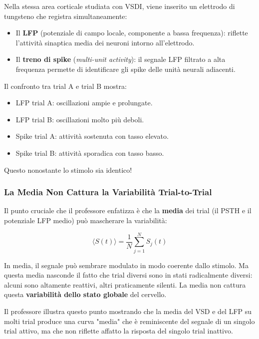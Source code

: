 Nella stessa area corticale studiata con VSDI, viene inserito un elettrodo di tungsteno che registra simultaneamente:
\begin{itemize}
    \item Il \textbf{LFP} (potenziale di campo locale, componente a bassa frequenza): riflette l'attività sinaptica media dei neuroni intorno all'elettrodo.
    \item Il \textbf{treno di spike} (\textit{multi-unit activity}): il segnale LFP filtrato a alta frequenza permette di identificare gli spike delle unità neurali adiacenti.
\end{itemize}

Il confronto tra trial A e trial B mostra:
\begin{itemize}
    \item LFP trial A: oscillazioni ampie e prolungate.
    \item LFP trial B: oscillazioni molto più deboli.
    \item Spike trial A: attività sostenuta con tasso elevato.
    \item Spike trial B: attività sporadica con tasso basso.
\end{itemize}

Questo nonostante lo stimolo sia identico!

\subsubsection{La Media Non Cattura la Variabilità Trial-to-Trial}

Il punto cruciale che il professore enfatizza è che la \textbf{media} dei trial (il PSTH e il potenziale LFP medio) può mascherare la variabilità:

\begin{equation}
\langle S(t) \rangle = \frac{1}{N} \sum_{j=1}^N S_j(t)
\end{equation}

In media, il segnale può sembrare modulato in modo coerente dallo stimolo. Ma questa media nasconde il fatto che trial diversi sono in stati radicalmente diversi: alcuni sono altamente reattivi, altri praticamente silenti. La media non cattura questa \textbf{variabilità dello stato globale} del cervello.

Il professore illustra questo punto mostrando che la media del VSD e del LFP su molti trial produce una curva "media" che è reminiscente del segnale di un singolo trial attivo, ma che non riflette affatto la risposta del singolo trial inattivo.

